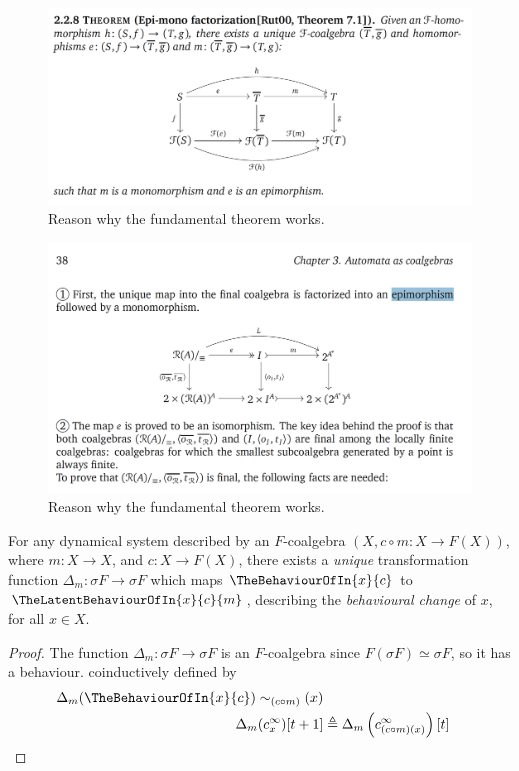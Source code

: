 \begin{figure}[t]
    \centering
    \includegraphics[width=1\textwidth]{Figures/Epi-monofactorisation.png}
    \caption{Reason why the fundamental theorem works.}
    \label{fig:LambdaCurves}
    \end{figure}

\begin{figure}[t]
    \centering
    \includegraphics[width=1\textwidth]{Figures/FundamentalTheo.png}
    \caption{Reason why the fundamental theorem works.}
    \label{fig:LambdaCurves}
    \end{figure}

\begin{proposition}
For any dynamical system described by an $F$-coalgebra 
$(X,c\circ m\colon X\rightarrow F(X))$, where $m\colon X\rightarrow X$, and  $c\colon X\rightarrow F(X)$, there exists a \emph{unique} transformation function $\Delta_m\colon \sigma F\rightarrow \sigma F$ which maps $\TheBehaviourOfIn{x}{c}$ to $\TheLatentBehaviourOfIn{x}{c}{m}$, describing the \emph{behavioural change} of $x$, for all $x\in X$.
\end{proposition}
\begin{proof}
    The function $\Delta_{m}\colon \sigma F\rightarrow \sigma F$ is an $F$-coalgebra since $F(\sigma F)\simeq \sigma F$, so it has a behaviour. 
coinductively defined by 
{\color{red}
\begin{align*}
    \Delta_{m}(\TheBehaviourOfIn{x}{c}) \sim_{(c \circ m)} (x)\\
    \Delta_{m}(c^\infty_x)[t+1]&\triangleq \Delta_{m}\left(c^\infty_{(c\circ m)(x)}\right)[t]
\end{align*}
}
\end{proof}

